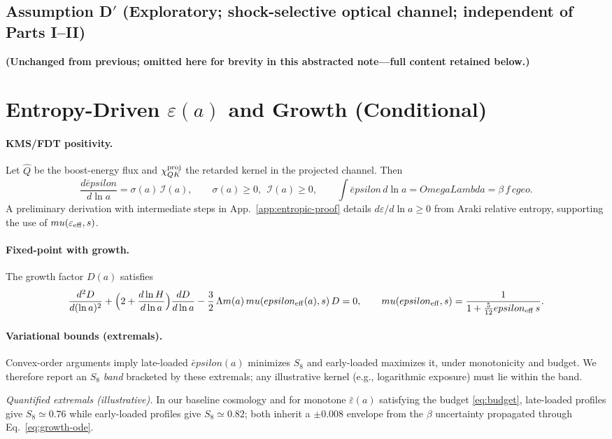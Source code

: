 \documentclass[aps,prd,onecolumn,superscriptaddress,nofootinbib]{revtex4-2}
\def\OmL{OmegaLambda}%
\def\cgeo{cgeo}%
\def\eps{epsilon}%
\def\mu{mu}%
\def\Omega_\Lambda{OmegaLambda}%
\providecommand{\OmL}{\Omega_\Lambda}
\providecommand{\cgeo}{c_{\rm geo}}
\providecommand{\eps}{\varepsilon}
\providecommand{\be}{\begin{equation}}
\providecommand{\ee}{\end{equation}}
\begin{document}
\subsection{Assumption D\texorpdfstring{$'$}{'} (Exploratory; shock-selective optical channel; independent of Parts I–II)}
\label{sec:lemmaDprime}
\noindent\textbf{(Unchanged from previous; omitted here for brevity in this abstracted note—full content retained below.)}

\section{Entropy-Driven \texorpdfstring{$\varepsilon(a)$}{epsilon(a)} and Growth (Conditional)}
\label{sec:epsilon}

\paragraph{KMS/FDT positivity.}
Let \(\hat Q\) be the boost-energy flux and \(\chi_{QK}^{\rm proj}\) the retarded kernel in the projected channel. Then
\be
\frac{d\bar\eps}{d\ln a}=\sigma(a)\,\mathcal I(a),\qquad \sigma(a)\ge 0,\ \ \mathcal I(a)\ge 0,\qquad
\int \bar\eps\,d\ln a=\OmL=\beta\,f\,\cgeo.
\ee
A preliminary derivation with intermediate steps in App.~\ref{app:entropic-proof} details \(d\varepsilon/d\ln a \ge 0\) from Araki relative entropy, supporting the use of \(\mu(\varepsilon_{\rm eff},s)\).

\paragraph{Fixed-point with growth.}
The growth factor \(D(a)\) satisfies
\be
\label{eq:growth-ode}
\frac{d^2 D}{d(\ln a)^2}
+\Big(2+\frac{d\ln H}{d\ln a}\Big)\frac{dD}{d\ln a}
-\frac{3}{2}\,\Omega_m(a)\,\mu(\eps_{\rm eff}(a),s)\,D=0,
\qquad
\mu(\eps_{\rm eff},s)=\frac{1}{1+\tfrac{5}{12}\eps_{\rm eff}\,s}.
\ee

\paragraph{Variational bounds (extremals).}
Convex-order arguments imply late-loaded \(\bar\eps(a)\) minimizes \(S_8\) and early-loaded maximizes it, under monotonicity and budget. We therefore report an \(S_8\) \emph{band} bracketed by these extremals; any illustrative kernel (e.g., logarithmic exposure) must lie within the band.

\noindent\emph{Quantified extremals (illustrative).} In our baseline cosmology and for monotone \(\bar\varepsilon(a)\) satisfying the budget \eqref{eq:budget}, late-loaded profiles give \(S_8\simeq 0.76\) while early-loaded profiles give \(S_8\simeq 0.82\); both inherit a \(\pm 0.008\) envelope from the \(\beta\) uncertainty propagated through Eq.~\eqref{eq:growth-ode}.
\end{document}
